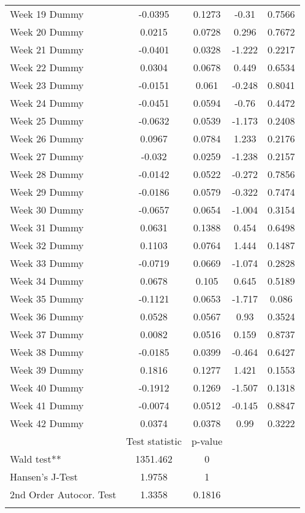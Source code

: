 \begin{longtable}{lcccc}
  Week 19 Dummy & -0.0395 & 0.1273 & -0.31 & 0.7566 \\ 
  Week 20 Dummy & 0.0215 & 0.0728 & 0.296 & 0.7672 \\ 
  Week 21 Dummy & -0.0401 & 0.0328 & -1.222 & 0.2217 \\ 
  Week 22 Dummy & 0.0304 & 0.0678 & 0.449 & 0.6534 \\ 
  Week 23 Dummy & -0.0151 & 0.061 & -0.248 & 0.8041 \\ 
  Week 24 Dummy & -0.0451 & 0.0594 & -0.76 & 0.4472 \\ 
  Week 25 Dummy & -0.0632 & 0.0539 & -1.173 & 0.2408 \\ 
  Week 26 Dummy & 0.0967 & 0.0784 & 1.233 & 0.2176 \\ 
  Week 27 Dummy & -0.032 & 0.0259 & -1.238 & 0.2157 \\ 
  Week 28 Dummy & -0.0142 & 0.0522 & -0.272 & 0.7856 \\ 
  Week 29 Dummy & -0.0186 & 0.0579 & -0.322 & 0.7474 \\ 
  Week 30 Dummy & -0.0657 & 0.0654 & -1.004 & 0.3154 \\ 
  Week 31 Dummy & 0.0631 & 0.1388 & 0.454 & 0.6498 \\ 
  Week 32 Dummy & 0.1103 & 0.0764 & 1.444 & 0.1487 \\ 
  Week 33 Dummy & -0.0719 & 0.0669 & -1.074 & 0.2828 \\ 
  Week 34 Dummy & 0.0678 & 0.105 & 0.645 & 0.5189 \\ 
  Week 35 Dummy & -0.1121 & 0.0653 & -1.717 & 0.086 \\ 
  Week 36 Dummy & 0.0528 & 0.0567 & 0.93 & 0.3524 \\ 
  Week 37 Dummy & 0.0082 & 0.0516 & 0.159 & 0.8737 \\ 
  Week 38 Dummy & -0.0185 & 0.0399 & -0.464 & 0.6427 \\ 
  Week 39 Dummy & 0.1816 & 0.1277 & 1.421 & 0.1553 \\ 
  Week 40 Dummy & -0.1912 & 0.1269 & -1.507 & 0.1318 \\ 
  Week 41 Dummy & -0.0074 & 0.0512 & -0.145 & 0.8847 \\ 
  Week 42 Dummy & 0.0374 & 0.0378 & 0.99 & 0.3222 \\ 
   & Test statistic & p-value &  &  \\ 
  Wald test** & 1351.462 & 0 &  &  \\ 
  Hansen's J-Test & 1.9758 & 1 &  &  \\ 
  2nd Order Autocor. Test & 1.3358 & 0.1816 &  &  \\ 
   \bottomrule
\caption{Results of two-step GMM estimation of policy, behavior and information on %
\label{tab_results:deaths_spec_5_full}
\end{longtable}
\endgroup
